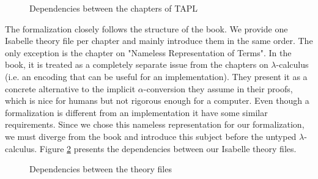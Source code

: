 \begin{figure}[h]
  \begin{center}
  \end{center}
  \caption{Dependencies between the chapters of TAPL}
  \label{fig:TAPL-dependencies}
\end{figure}

The formalization closely follows the structure of the book. We provide one Isabelle theory file per
chapter and mainly introduce them in the same order. The only exception is the chapter on "Nameless
Representation of Terms". In the book, it is treated as a completely separate issue from the
chapters on $\lambda$-calculus (i.e. an encoding that can be useful for an implementation). They
present it as a concrete alternative to the implicit $\alpha$-conversion they assume in their
proofs, which is nice for humans but not rigorous enough for a computer. Even though a formalization
is different from an implementation it have some similar requirements. Since we chose this nameless
representation for our formalization, we must diverge from the book and introduce this subject
before the untyped $\lambda$-calculus. Figure \ref{fig:thys-dependencies} presents the dependencies
between our Isabelle theory files.

\begin{figure}[h]
  \begin{center}
  \end{center}
  \caption{Dependencies between the theory files}
  \label{fig:thys-dependencies}
\end{figure}

